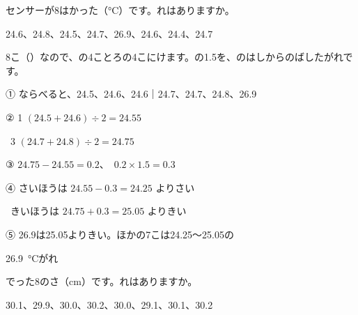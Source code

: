 \begin{reidai}[\R{外}{はず}れ\R{値}{ち}を\R{見}{み}つける]
センサーが8はかった（\unit{\degreeCelsius}）です。れはありますか。\par
\begin{center}\footnotesize 24.6、24.8、24.5、24.7、26.9、24.6、24.4、24.7\end{center}
\kangaekata 8こ（）なので、の4ことろの4こにけます。の1.5を、のはしからのばしたがれです。\par
\shiki ① ならべると、24.5、24.6、24.6\enspace{}｜\enspace{}24.7、24.7、24.8、26.9\par
\hspace*{2.6\zw}② 1 $(24.5+24.6)\div2=24.55$\par
\hspace*{2.6\zw}\phantom{②}\ 3 $(24.7+24.8)\div2=24.75$\par
\hspace*{2.6\zw}③  $24.75-24.55=0.2$、\ $0.2\times1.5=0.3$\par
\hspace*{2.6\zw}④ さいほうは $24.55-0.3=24.25$ よりさい\par
\hspace*{2.6\zw}\phantom{④}\ きいほうは $24.75+0.3=25.05$ よりきい\par
\hspace*{2.6\zw}⑤ 26.9は25.05よりきい。ほかの7こは24.25〜25.05の\par
\kotae \qty{26.9}{\degreeCelsius}がれ
\end{reidai}

\begin{jibun}
でった8のさ（cm）です。れはありますか。\par
{\footnotesize 30.1、29.9、30.0、30.2、30.0、29.1、30.1、30.2}
\end{jibun}

